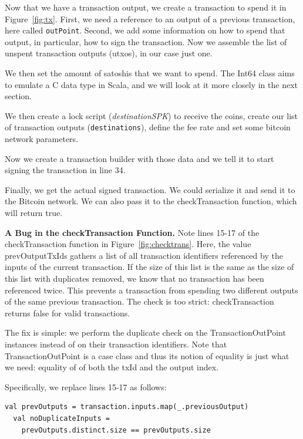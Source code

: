 \documentclass[runningheads]{llncs}
\renewcommand{\paragraph}{\textbf}%
\begin{document}
Now that we have a transaction output, we create a transaction to
spend it in Figure~\ref{fig:tx}. First, we need a reference to an
output of a previous transaction, here called
\texttt{outPoint}. Second, we add some information on how to spend
that output, in particular, how to sign the transaction. Now we
assemble the list of unspent transaction outputs (utxos), in our case
just one.

We then set the amount of satoshis that we want to spend. The Int64
class aims to emulate a C data type in Scala, and we will look at it
more closely in the next section.

We then create a lock script (\textit{destinationSPK}) to receive the
coins, create our list of transaction outputs (\texttt{destinations}),
define the fee rate and set some bitcoin network parameters.

Now we create a transaction builder with those data and we tell it to
start signing the transaction in line 34.

Finally, we get the actual signed transaction. We could serialize it
and send it to the Bitcoin network. We can also pass it to the
checkTransaction function, which will return true.

\paragraph{A Bug in the checkTransaction Function.} Note lines 15-17
of the checkTransaction function in Figure~\ref{fig:checktrans}. Here,
the value prevOutputTxIds gathers a list of all transaction identifiers
referenced by the inputs of the current transaction. If the size of
this list is the same as the size of this list with duplicates
removed, we know that no transaction has been referenced twice. This
prevents a transaction from spending two different outputs of the same
previous transaction. The check is too strict: checkTransaction
returns false for valid transactions.

The fix is simple: we perform the duplicate check on the
TransactionOutPoint instances instead of on their transaction
identifiers. Note that TransactionOutPoint is a case class and thus
its notion of equality is just what we need: equality of of both the
txId and the output index.

Specifically, we replace lines 15-17 as follows:
\begin{lstlisting}[style=scala, firstnumber=15]
  val prevOutputs = transaction.inputs.map(_.previousOutput)
  val noDuplicateInputs = 
    prevOutputs.distinct.size == prevOutputs.size
\end{lstlisting}
\end{document}
